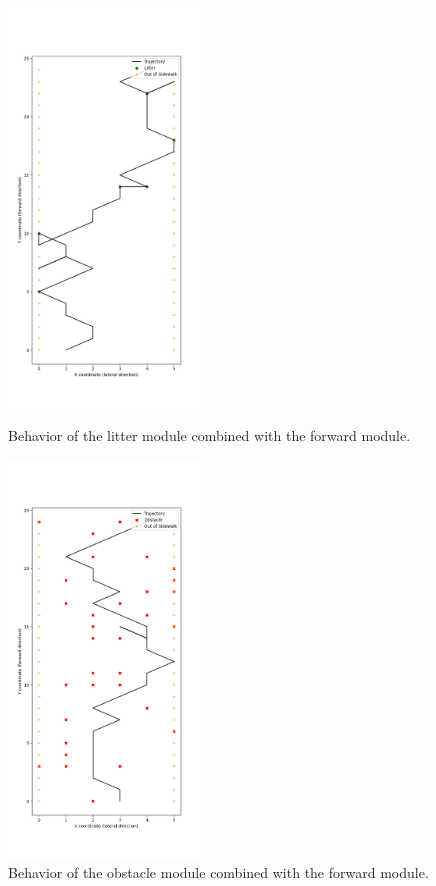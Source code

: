 \documentclass[conference]{IEEEtran}
\begin{document}
\begin{figure}[!t]
	\centering
	\includegraphics[width=2in]{litter_eval.png}	
	\caption{Behavior of the litter module combined with the forward module.}
	\label{fig:litter_eval}
	\includegraphics[width=2in]{obstacle_eval.png}	
	\caption{Behavior of the obstacle module combined with the forward module.}
	\label{fig:obstacle_eval}
\end{figure}
\end{document}
